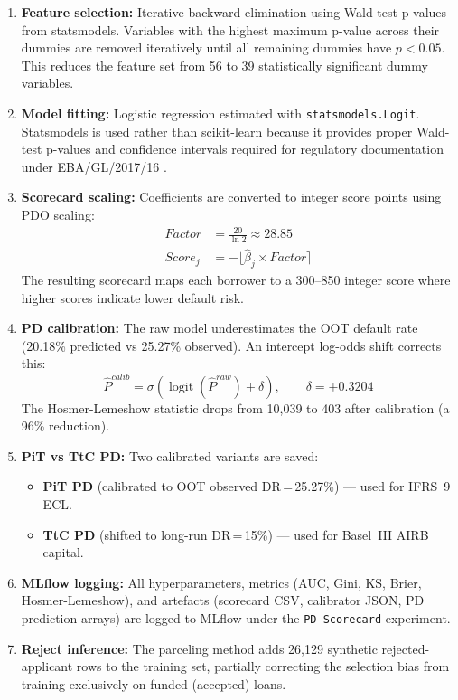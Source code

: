 \documentclass[12pt,a4paper]{report}
\begin{document}
\begin{enumerate}
  \item \textbf{Feature selection:} Iterative backward elimination using Wald-test p-values from statsmodels. Variables with the highest maximum p-value across their dummies are removed iteratively until all remaining dummies have $p < 0.05$. This reduces the feature set from 56 to 39 statistically significant dummy variables.

  \item \textbf{Model fitting:} Logistic regression estimated with \texttt{statsmodels.Logit}. Statsmodels is used rather than scikit-learn because it provides proper Wald-test p-values and confidence intervals required for regulatory documentation under EBA/GL/2017/16 \cite{eba2017a}.

  \item \textbf{Scorecard scaling:} Coefficients are converted to integer score points using PDO scaling:
  \begin{align}
    Factor &= \frac{20}{\ln 2} \approx 28.85 \\
    Score_j &= -\lfloor \hat{\beta}_j \times Factor \rceil
  \end{align}
  The resulting scorecard maps each borrower to a 300--850 integer score where higher scores indicate lower default risk.

  \item \textbf{PD calibration:} The raw model underestimates the OOT default rate (20.18\% predicted vs 25.27\% observed). An intercept log-odds shift corrects this:
  \begin{equation}
    \hat{P}^{calib} = \sigma\!\left(\operatorname{logit}(\hat{P}^{raw}) + \delta\right), \qquad \delta = +0.3204
  \end{equation}
  The Hosmer-Lemeshow statistic drops from 10,039 to 403 after calibration (a 96\% reduction).

  \item \textbf{PiT vs TtC PD:} Two calibrated variants are saved:
  \begin{itemize}
    \item \textbf{PiT PD} (calibrated to OOT observed DR\,=\,25.27\%) --- used for IFRS~9 ECL.
    \item \textbf{TtC PD} (shifted to long-run DR\,=\,15\%) --- used for Basel~III AIRB capital.
  \end{itemize}

  \item \textbf{MLflow logging:} All hyperparameters, metrics (AUC, Gini, KS, Brier, Hosmer-Lemeshow), and artefacts (scorecard CSV, calibrator JSON, PD prediction arrays) are logged to MLflow under the \texttt{PD-Scorecard} experiment.

  \item \textbf{Reject inference:} The parceling method adds 26,129 synthetic rejected-applicant rows to the training set, partially correcting the selection bias from training exclusively on funded (accepted) loans.
\end{enumerate}
\end{document}
